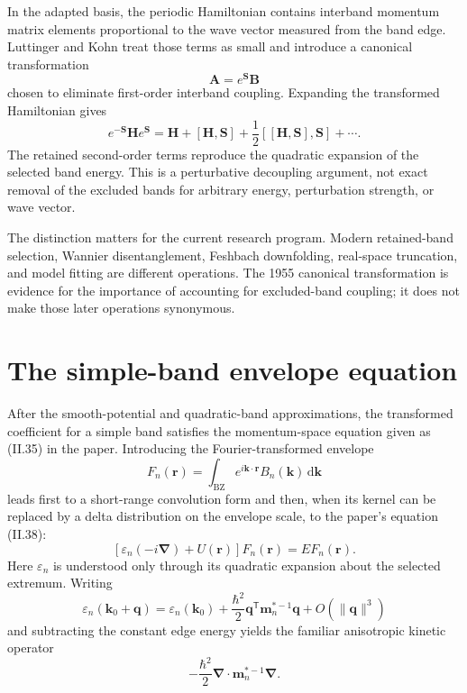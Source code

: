 In the adapted basis, the periodic Hamiltonian contains interband momentum
matrix elements proportional to the wave vector measured from the band edge.
Luttinger and Kohn treat those terms as small and introduce a canonical
transformation
\begin{equation}
  \mathbf A=e^{\mathbf S}\mathbf B
\end{equation}
chosen to eliminate first-order interband coupling. Expanding the transformed
Hamiltonian gives
\begin{equation}
  e^{-\mathbf S}\mathbf H e^{\mathbf S}
  =
  \mathbf H+[\mathbf H,\mathbf S]
  +\frac{1}{2}[[\mathbf H,\mathbf S],\mathbf S]+\cdots.
\end{equation}
The retained second-order terms reproduce the quadratic expansion of the
selected band energy. This is a perturbative decoupling argument, not exact
removal of the excluded bands for arbitrary energy, perturbation strength, or
wave vector.

The distinction matters for the current research program. Modern retained-band
selection, Wannier disentanglement, Feshbach downfolding, real-space
truncation, and model fitting are different operations. The 1955 canonical
transformation is evidence for the importance of accounting for excluded-band
coupling; it does not make those later operations synonymous.

\section{The simple-band envelope equation}

After the smooth-potential and quadratic-band approximations, the transformed
coefficient for a simple band satisfies the momentum-space equation given as
(II.35) in the paper. Introducing the Fourier-transformed envelope
\begin{equation}
  F_n(\mathbf r)
  =
  \int_{\mathrm{BZ}}
  e^{i\mathbf k\cdot\mathbf r}B_n(\mathbf k)\,\mathrm{d}\mathbf k
\end{equation}
leads first to a short-range convolution form and then, when its kernel can be
replaced by a delta distribution on the envelope scale, to the paper's equation
(II.38):
\begin{equation}
  \left[
    \varepsilon_n(-i\boldsymbol\nabla)
    +U(\mathbf r)
  \right]F_n(\mathbf r)
  =
  E F_n(\mathbf r).
  \label{eq:lk-envelope-operator}
\end{equation}
Here $\varepsilon_n$ is understood only through its quadratic expansion about
the selected extremum. Writing
\begin{equation}
  \varepsilon_n(\mathbf k_0+\mathbf q)
  =
  \varepsilon_n(\mathbf k_0)
  +
  \frac{\hbar^2}{2}
  \mathbf q^{\mathsf T}\mathbf m_n^{*-1}\mathbf q
  +O(\lVert\mathbf q\rVert^3)
\end{equation}
and subtracting the constant edge energy yields the familiar anisotropic
kinetic operator
\begin{equation}
  -\frac{\hbar^2}{2}
  \boldsymbol\nabla\mathbin{\cdot}
  \mathbf m_n^{*-1}
  \boldsymbol\nabla.
\end{equation}

